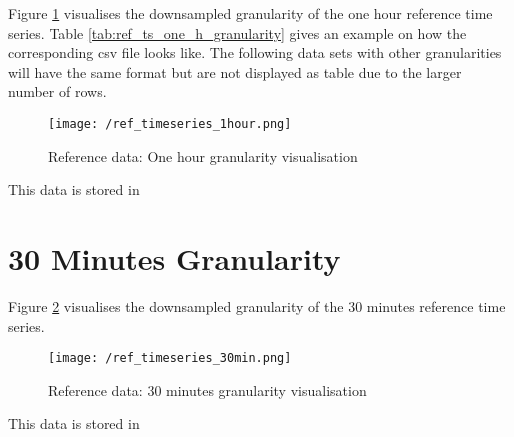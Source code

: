 Figure \ref{fig:ref_ts_one_h_granularity} visualises the downsampled granularity of the one hour reference time series.
Table \ref{tab:ref_ts_one_h_granularity} gives an example on how the corresponding csv file looks like. The following data sets with other granularities will have the same format but are not displayed as table due to the larger number of rows.

\begin{figure}[h!]
	\texttt{[image: /ref\_timeseries\_1hour.png]}
	\caption{Reference data: One hour granularity visualisation}
	\label{fig:ref_ts_one_h_granularity}
\end{figure}


\begin{table}[h!]
\centering
{}
\caption{Reference data: One hour granularity data}
\label{tab:ref_ts_one_h_granularity}
\end{table}

This data is stored in 


\clearpage
\section{30 Minutes Granularity}

Figure \ref{fig:ref_ts_30_m_granularity} visualises the downsampled granularity of the 30 minutes reference time series.

\begin{figure}[h!]
	\texttt{[image: /ref\_timeseries\_30min.png]}
	\caption{Reference data: 30 minutes granularity visualisation}
	\label{fig:ref_ts_30_m_granularity}
\end{figure}

This data is stored in 



